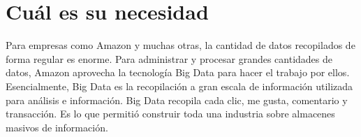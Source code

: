 \section{Cuál es su necesidad}

Para empresas como Amazon y muchas otras, la cantidad de datos recopilados de forma regular es enorme. Para administrar y procesar grandes cantidades de datos, Amazon aprovecha la tecnología Big Data para hacer el trabajo por ellos. Esencialmente, Big Data es la recopilación a gran escala de información utilizada para análisis e información. Big Data recopila cada clic, me gusta, comentario y transacción. Es lo que permitió construir toda una industria sobre almacenes masivos de información.

\clearpage
